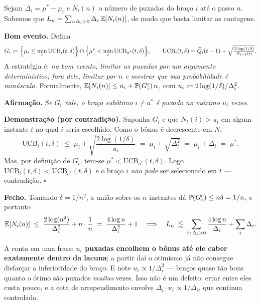 \documentclass[11pt, a4paper]{article}
\newcommand{\Qhat}{\widehat{Q}}
\newcommand{\Nc}{N}
\newcommand{\gap}{\Delta}
\newcommand{\UCB}{\mathrm{UCB}}
\newcommand{\Reg}{L}
\begin{document}
\begin{provabox}
Sejam $\gap_i = \mu^{*} - \mu_i$ e $\Nc_i(n)$ o número de puxadas do braço
$i$ até o passo $n$. Sabemos que
$\Reg_n = \sum_{i:\gap_i>0} \gap_i\,\E[\Nc_i(n)]$, de modo que basta limitar
as contagens.

\smallskip
\textbf{Bom evento.} Defina
\[
  G_i \defeq \Bigl\{\mu_i \le \min_t \UCB_i(t,\delta)\Bigr\}
    \cap \Bigl\{\mu^{*} < \min_t \UCB_{a^{*}}(t,\delta)\Bigr\},
  \qquad
  \UCB_i(t,\delta) = \Qhat_i(t-1) + \sqrt{\tfrac{2\log(1/\delta)}{\Nc_{t-1}(i)}}.
\]
A estratégia é: \emph{no bom evento, limitar as puxadas por um argumento
determinístico; fora dele, limitar por $n$ e mostrar que sua probabilidade é
minúscula.} Formalmente,
$\E[\Nc_i(n)] \le u_i + \Prob(G_i^{c})\,n$, com
$u_i \defeq 2\log(1/\delta)/\gap_i^2$.

\smallskip
\textbf{Afirmação.} \emph{Se $G_i$ vale, o braço subótimo $i \ne a^{*}$ é
puxado no máximo $u_i$ vezes.}

\smallskip
\textbf{Demonstração (por contradição).} Suponha $G_i$ e que
$\Nc_t(i) > u_i$ em algum instante $t$ no qual $i$ seria escolhido. Como o
bônus é decrescente em $\Nc$,
\[
  \UCB_i(t,\delta) \;\le\; \mu_i + \sqrt{\frac{2\log(1/\delta)}{u_i}}
    \;=\; \mu_i + \sqrt{\gap_i^2} \;=\; \mu_i + \gap_i \;=\; \mu^{*}.
\]
Mas, por definição de $G_i$, tem-se $\mu^{*} < \UCB_{a^{*}}(t,\delta)$. Logo
$\UCB_i(t,\delta) < \UCB_{a^{*}}(t,\delta)$ e o braço $i$ \emph{não pode} ser
selecionado em $t$ — contradição. \hfill $\square$

\smallskip
\textbf{Fecho.} Tomando $\delta = 1/n^2$, a união sobre os $n$ instantes dá
$\mathbb{P}(G_i^{c}) \le n\delta = 1/n$, e portanto
\[
  \E[\Nc_i(n)] \;\le\; \frac{2\log(n^2)}{\gap_i^2} + n\cdot\frac1n
    \;=\; \frac{4\log n}{\gap_i^2} + 1
  \quad\Longrightarrow\quad
  \Reg_n \;\lesssim\; \sum_{i\,:\,\gap_i>0}\frac{4\log n}{\gap_i} + \sum_i \gap_i.
\]
\end{provabox}

\begin{ideiabox}
A conta em uma frase: \textbf{$u_i$ puxadas encolhem o bônus até ele caber
exatamente dentro da lacuna}; a partir daí o otimismo já não consegue
disfarçar a inferioridade do braço. E note $u_i \propto 1/\gap_i^2$ — braços
quase tão bons quanto o ótimo são puxados \emph{muitas} vezes. Isso não é um
defeito: errar entre eles custa pouco, e a cota de arrependimento envolve
$\gap_i \cdot u_i \propto 1/\gap_i$, que continua controlado.
\end{ideiabox}
\end{document}
